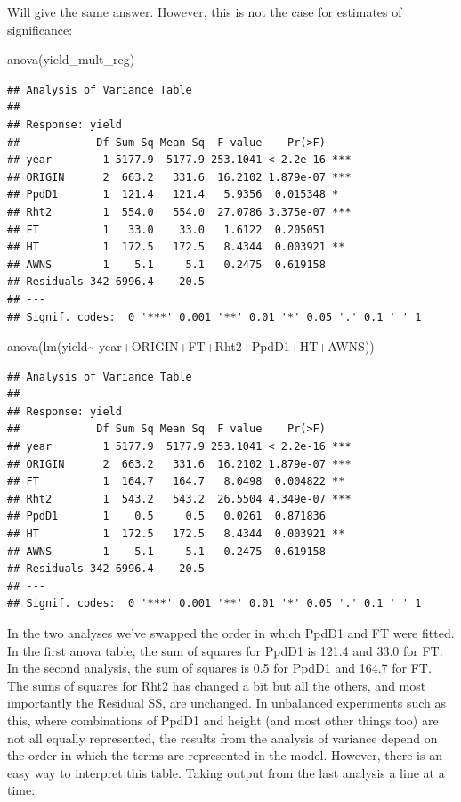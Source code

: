 \documentclass[
]{book}
\newenvironment{Shaded}{\begin{snugshade}}{\end{snugshade}}
\newcommand{\FunctionTok}[1]{\textcolor[rgb]{0.00,0.00,0.00}{#1}}
\newcommand{\NormalTok}[1]{#1}
\newcommand{\SpecialCharTok}[1]{\textcolor[rgb]{0.00,0.00,0.00}{#1}}
\begin{document}
Will give the same answer. However, this is not the case for estimates of significance:

\begin{Shaded}
\begin{Highlighting}[]
\FunctionTok{anova}\NormalTok{(yield\_mult\_reg)}
\end{Highlighting}
\end{Shaded}

\begin{verbatim}
## Analysis of Variance Table
## 
## Response: yield
##            Df Sum Sq Mean Sq  F value    Pr(>F)    
## year        1 5177.9  5177.9 253.1041 < 2.2e-16 ***
## ORIGIN      2  663.2   331.6  16.2102 1.879e-07 ***
## PpdD1       1  121.4   121.4   5.9356  0.015348 *  
## Rht2        1  554.0   554.0  27.0786 3.375e-07 ***
## FT          1   33.0    33.0   1.6122  0.205051    
## HT          1  172.5   172.5   8.4344  0.003921 ** 
## AWNS        1    5.1     5.1   0.2475  0.619158    
## Residuals 342 6996.4    20.5                       
## ---
## Signif. codes:  0 '***' 0.001 '**' 0.01 '*' 0.05 '.' 0.1 ' ' 1
\end{verbatim}

\begin{Shaded}
\begin{Highlighting}[]
\FunctionTok{anova}\NormalTok{(}\FunctionTok{lm}\NormalTok{(yield}\SpecialCharTok{\textasciitilde{}}\NormalTok{ year}\SpecialCharTok{+}\NormalTok{ORIGIN}\SpecialCharTok{+}\NormalTok{FT}\SpecialCharTok{+}\NormalTok{Rht2}\SpecialCharTok{+}\NormalTok{PpdD1}\SpecialCharTok{+}\NormalTok{HT}\SpecialCharTok{+}\NormalTok{AWNS))}
\end{Highlighting}
\end{Shaded}

\begin{verbatim}
## Analysis of Variance Table
## 
## Response: yield
##            Df Sum Sq Mean Sq  F value    Pr(>F)    
## year        1 5177.9  5177.9 253.1041 < 2.2e-16 ***
## ORIGIN      2  663.2   331.6  16.2102 1.879e-07 ***
## FT          1  164.7   164.7   8.0498  0.004822 ** 
## Rht2        1  543.2   543.2  26.5504 4.349e-07 ***
## PpdD1       1    0.5     0.5   0.0261  0.871836    
## HT          1  172.5   172.5   8.4344  0.003921 ** 
## AWNS        1    5.1     5.1   0.2475  0.619158    
## Residuals 342 6996.4    20.5                       
## ---
## Signif. codes:  0 '***' 0.001 '**' 0.01 '*' 0.05 '.' 0.1 ' ' 1
\end{verbatim}

In the two analyses we've swapped the order in which PpdD1 and FT were fitted. In the first anova table, the sum of squares for PpdD1 is 121.4 and 33.0 for FT. In the second analysis, the sum of squares is 0.5 for PpdD1 and 164.7 for FT. The sums of squares for Rht2 has changed a bit but all the others, and most importantly the Residual SS, are unchanged. In unbalanced experiments such as this, where combinations of PpdD1 and height (and most other things too) are not all equally represented, the results from the analysis of variance depend on the order in which the terms are represented in the model. However, there is an easy way to interpret this table. Taking output from the last analysis a line at a time:
\end{document}
